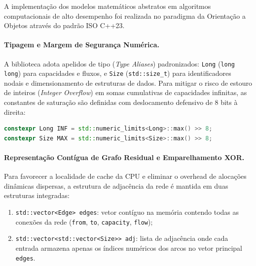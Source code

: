 \label{ap:arquitetura}

A implementação dos modelos matemáticos abstratos em algoritmos computacionais de alto desempenho foi realizada no paradigma da Orientação a Objetos através do padrão ISO C++23.

\paragraph{Tipagem e Margem de Segurança Numérica.}
A biblioteca adota apelidos de tipo (\textit{Type Aliases}) padronizados: \lstinline{Long} (\lstinline{long long}) para capacidades e fluxos, e \lstinline{Size} (\lstinline{std::size_t}) para identificadores nodais e dimensionamento de estruturas de dados. Para mitigar o risco de estouro de inteiros (\textit{Integer Overflow}) em somas cumulativas de capacidades infinitas, as constantes de saturação são definidas com deslocamento defensivo de 8 bits à direita:
\begin{lstlisting}[language=C++, numbers=none, basicstyle=\ttfamily\footnotesize, frame=none, backgroundcolor=\color{white}]
constexpr Long INF = std::numeric_limits<Long>::max() >> 8;
constexpr Size MAX = std::numeric_limits<Size>::max() >> 8;
\end{lstlisting}

\paragraph{Representação Contígua de Grafo Residual e Emparelhamento XOR.}
Para favorecer a localidade de cache da CPU e eliminar o overhead de alocações dinâmicas dispersas, a estrutura de adjacência da rede é mantida em duas estruturas integradas:
\begin{enumerate}
    \item \lstinline{std::vector<Edge> edges}: vetor contíguo na memória contendo todas as conexões da rede (\lstinline{from}, \lstinline{to}, \lstinline{capacity}, \lstinline{flow});
    \item \lstinline{std::vector<std::vector<Size>> adj}: lista de adjacência onde cada entrada armazena apenas os índices numéricos dos arcos no vetor principal \lstinline{edges}.
\end{enumerate}

